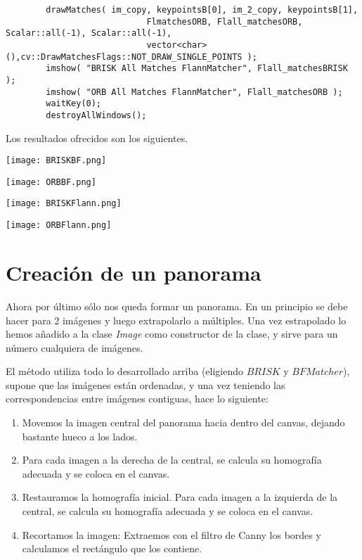 \documentclass[a4paper, 11pt]{article}
\theoremstyle{definition}
\begin{document}
\begin{lstlisting}
        drawMatches( im_copy, keypointsB[0], im_2_copy, keypointsB[1],
                            FlmatchesORB, Flall_matchesORB, Scalar::all(-1), Scalar::all(-1),
                            vector<char>(),cv::DrawMatchesFlags::NOT_DRAW_SINGLE_POINTS );
        imshow( "BRISK All Matches FlannMatcher", Flall_matchesBRISK );
        imshow( "ORB All Matches FlannMatcher", Flall_matchesORB );
        waitKey(0);
        destroyAllWindows();
      \end{lstlisting}

      Los resultados ofrecidos son los siguientes.

      \centerline{\texttt{[image: BRISKBF.png]}}
      \centerline{\texttt{[image: ORBBF.png]}}



      \centerline{\texttt{[image: BRISKFlann.png]}}
      \centerline{\texttt{[image: ORBFlann.png]}}

  \section {Creación de un panorama}

    Ahora por último sólo nos queda formar un panorama. En un principio se debe hacer
    para 2 imágenes y luego extrapolarlo a múltiples. Una vez estrapolado lo hemos añadido
    a la clase \textit{Image} como constructor de la clase, y sirve para un número cualquiera de imágenes.

    El método utiliza todo lo desarrollado arriba (eligiendo $BRISK$ y $BFMatcher$), supone que las imágenes están ordenadas,
    y una vez teniendo las correspondencias entre imágenes contiguas, hace lo siguiente:

    \begin{enumerate}
      \item Movemos la imagen central del panorama hacia dentro del canvas, dejando bastante hueco a los lados.
      \item Para cada imagen a la derecha de la central, se calcula su homografía adecuada y se coloca en el canvas.
      \item Restauramos la homografía inicial. Para cada imagen a la izquierda de la central, se calcula su homografía adecuada y se coloca en el canvas.
      \item Recortamos la imagen: Extraemos con el filtro de Canny los bordes y calculamos el rectángulo que los contiene.
    \end{enumerate}
\end{document}
